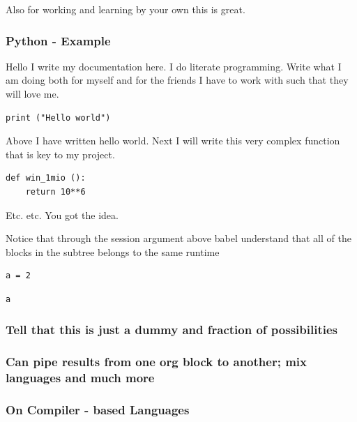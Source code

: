 \documentclass[a4paper]{article}
\begin{document}
Also for working and learning by your own this is great.

\subsubsection{Python - Example}
\label{sec:orgec46910}

Hello I write my documentation here. I do literate
programming. Write what I am doing both for myself and for the
friends I have to work with such that they will love me.

\begin{verbatim}
print ("Hello world")    
\end{verbatim}

Above I have written hello world. Next I will write this very
complex function that is key to my project.

\begin{verbatim}
def win_1mio ():
    return 10**6
\end{verbatim}

Etc. etc. You got the idea.

Notice that through the session argument above babel understand
that all of the blocks in the subtree belongs to the same runtime

\begin{verbatim}
a = 2
\end{verbatim}

\begin{verbatim}
a
\end{verbatim}

\subsubsection{Tell that this is just a dummy and fraction of possibilities}
\label{sec:org5a35e17}

\subsubsection{Can pipe results from one org block to another; mix languages and much more}
\label{sec:org5b0ee26}

\subsubsection{On Compiler - based Languages}
\label{sec:org77e8129}
\end{document}
